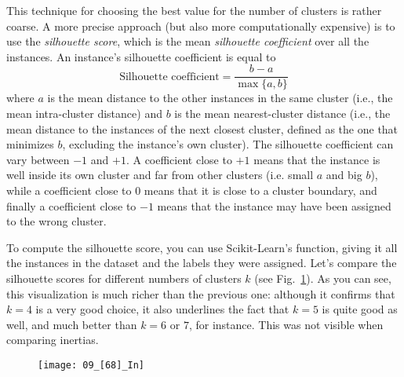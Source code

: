 This technique for choosing the best value for the number of clusters is rather coarse. A more precise approach (but also more computationally expensive) is to use the \emph{silhouette score}, which is the mean \emph{silhouette coefficient} over all the instances. An instance's silhouette coefficient is equal to
\begin{equation}\label{Silhouette_Coefficient}
\text{Silhouette coefficient}=\frac{b-a}{\max{\{a,b\}}}
\end{equation}
where $a$ is the mean distance to the other instances in the same cluster (i.e., the mean intra-cluster distance) and $b$ is the mean nearest-cluster distance (i.e., the mean distance to the instances of the next closest cluster, defined as the one that minimizes $b$, excluding the instance's own cluster). The silhouette coefficient can vary between $-1$ and $+1$. A coefficient close to $+1$ means that the instance is well inside its own cluster and far from other clusters (i.e. small $a$ and big $b$), while a coefficient close to 0 means that it is close to a cluster boundary, and finally a coefficient close to $-1$ means that the instance may have been assigned to the wrong cluster.

To compute the silhouette score, you can use Scikit-Learn's  function, giving it all the instances in the dataset and the labels they were assigned. Let's compare the silhouette scores for different numbers of clusters $k$ (see Fig.~\ref{09_[68]_In}). As you can see, this visualization is much richer than the previous one: although it confirms that $k=4$ is a very good choice, it also underlines the fact that $k=5$ is quite good as well, and much better than $k=6$ or $7$, for instance. This was not visible when comparing inertias.
\begin{figure}[h!t]
\centering
\texttt{[image: 09\_[68]\_In]}
\caption{}\label{09_[68]_In}
\end{figure}

